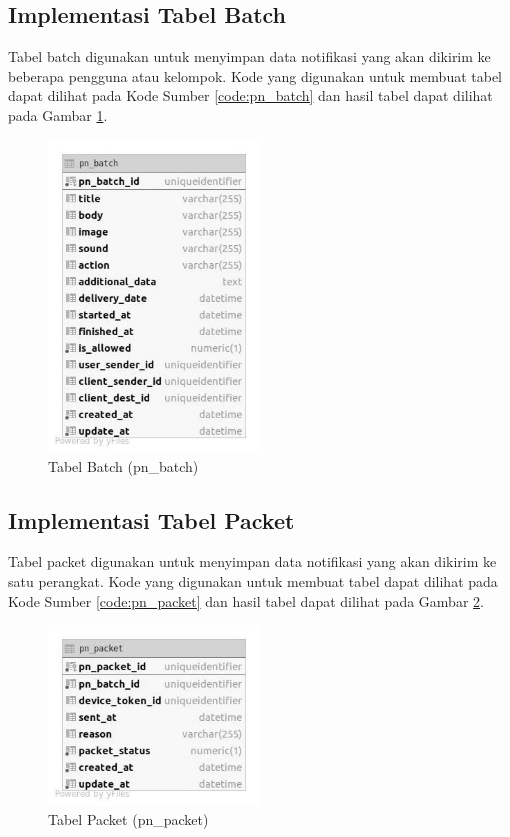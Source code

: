 \subsection{Implementasi Tabel Batch}
\par Tabel batch digunakan untuk menyimpan data notifikasi yang akan dikirim ke beberapa pengguna atau kelompok. Kode yang digunakan untuk membuat tabel dapat dilihat pada Kode Sumber \ref{code:pn_batch} dan hasil tabel dapat dilihat pada Gambar \ref{tabel_pn_batch}.

\begin{figure}[H]
	\caption{Tabel Batch (pn\_batch)}
	\label{tabel_pn_batch}
    \centering\includegraphics[width=0.5\textwidth]{bab4/figures/tabel_pn_batch.jpg}
\end{figure}

\subsection{Implementasi Tabel Packet}
\par Tabel packet digunakan untuk menyimpan data notifikasi yang akan dikirim ke satu perangkat. Kode yang digunakan untuk membuat tabel dapat dilihat pada Kode Sumber \ref{code:pn_packet} dan hasil tabel dapat dilihat pada Gambar \ref{tabel_pn_packet}.

\begin{figure}[H]
	\caption{Tabel Packet (pn\_packet)}
	\label{tabel_pn_packet}
    \centering\includegraphics[width=0.5\textwidth]{bab4/figures/tabel_pn_packet.jpg}
\end{figure}

